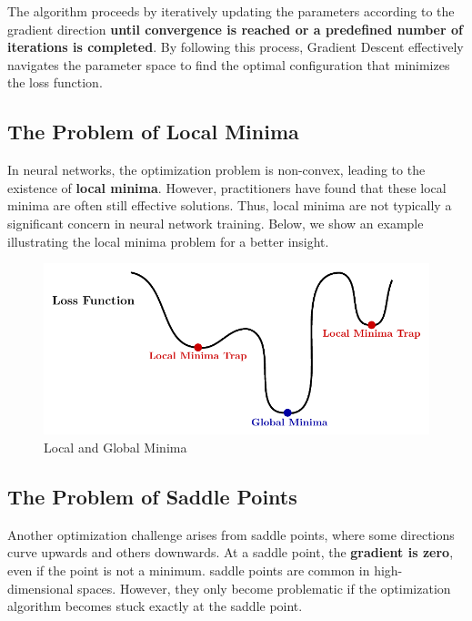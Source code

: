 The algorithm proceeds by iteratively updating the parameters according to the gradient direction \textbf{until convergence is reached or a predefined number of iterations is completed}. By following this process, Gradient Descent effectively navigates the parameter space to find the optimal configuration that minimizes the loss function.


\subsection{The Problem of Local Minima}

In neural networks, the optimization problem is non-convex, leading to the existence of \textbf{local minima}. However, practitioners have found that these local minima are often still effective solutions. Thus, local minima are not typically a significant concern in neural network training. Below, we show an example illustrating the local minima problem for a better insight.

\begin{figure}[!htbp]
    \centering
    \includegraphics[scale=0.9]{tikz/chapter2 - Local Minima.pdf}
    \caption{Local and Global Minima}
\end{figure}

\subsection{The Problem of Saddle Points}

Another optimization challenge arises from saddle points, where some directions curve upwards and others downwards. At a saddle point, the \textbf{gradient is zero}, even if the point is not a minimum. saddle points are common in high-dimensional spaces. However, they only become problematic if the optimization algorithm becomes stuck exactly at the saddle point.

